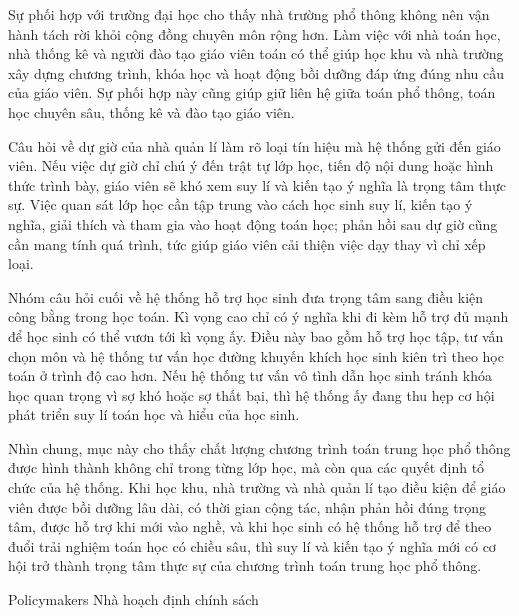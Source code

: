 {{    Sự phối hợp với trường đại học cho thấy nhà trường phổ thông không nên vận hành tách rời khỏi cộng đồng chuyên môn rộng hơn. Làm việc với nhà toán học, nhà thống kê và người đào tạo giáo viên toán có thể giúp học khu và nhà trường xây dựng chương trình, khóa học và hoạt động bồi dưỡng đáp ứng đúng nhu cầu của giáo viên. Sự phối hợp này cũng giúp giữ liên hệ giữa toán phổ thông, toán học chuyên sâu, thống kê và đào tạo giáo viên.

    Câu hỏi về dự giờ của nhà quản lí làm rõ loại tín hiệu mà hệ thống gửi đến giáo viên. Nếu việc dự giờ chỉ chú ý đến trật tự lớp học, tiến độ nội dung hoặc hình thức trình bày, giáo viên sẽ khó xem suy lí và kiến tạo ý nghĩa là trọng tâm thực sự. Việc quan sát lớp học cần tập trung vào cách học sinh suy lí, kiến tạo ý nghĩa, giải thích và tham gia vào hoạt động toán học; phản hồi sau dự giờ cũng cần mang tính quá trình, tức giúp giáo viên cải thiện việc dạy thay vì chỉ xếp loại.

    Nhóm câu hỏi cuối về hệ thống hỗ trợ học sinh đưa trọng tâm sang điều kiện công bằng trong học toán. Kì vọng cao chỉ có ý nghĩa khi đi kèm hỗ trợ đủ mạnh để học sinh có thể vươn tới kì vọng ấy. Điều này bao gồm hỗ trợ học tập, tư vấn chọn môn và hệ thống tư vấn học đường khuyến khích học sinh kiên trì theo học toán ở trình độ cao hơn. Nếu hệ thống tư vấn vô tình dẫn học sinh tránh khóa học quan trọng vì sợ khó hoặc sợ thất bại, thì hệ thống ấy đang thu hẹp cơ hội phát triển suy lí toán học và hiểu của học sinh.

    Nhìn chung, mục này cho thấy chất lượng chương trình toán trung học phổ thông được hình thành không chỉ trong từng lớp học, mà còn qua các quyết định tổ chức của hệ thống. Khi học khu, nhà trường và nhà quản lí tạo điều kiện để giáo viên được bồi dưỡng lâu dài, có thời gian cộng tác, nhận phản hồi đúng trọng tâm, được hỗ trợ khi mới vào nghề, và khi học sinh có hệ thống hỗ trợ để theo đuổi trải nghiệm toán học có chiều sâu, thì suy lí và kiến tạo ý nghĩa mới có cơ hội trở thành trọng tâm thực sự của chương trình toán trung học phổ thông.}
  }

\ParallelSection
  {Policymakers}
  {Nhà hoạch định chính sách}
  {}


